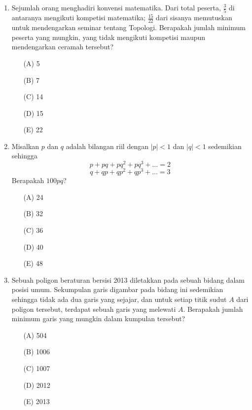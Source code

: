 \documentclass[12pt]{scrartcl}
\begin{document}
\begin{enumerate}
    \item Sejumlah orang menghadiri konvensi matematika. Dari total peserta, $\frac{3}{5}$ di antaranya mengikuti kompetisi matematika; $\frac{15}{22}$ dari sisanya memutuskan untuk mendengarkan seminar tentang Topologi. Berapakah jumlah minimum peserta yang mungkin, yang tidak mengikuti kompetisi maupun mendengarkan ceramah tersebut?
    \begin{itemize}
        \item[(A)] 5
        \item[(B)] 7
        \item[(C)] 14
        \item[(D)] 15
        \item[(E)] 22
    \end{itemize}

    \item Misalkan $p$ dan $q$ adalah bilangan riil dengan $|p|<1$ dan $|q|<1$ sedemikian sehingga
    \[p+pq+pq^{2}+pq^{3}+\dots=2\]
    \[q+qp+qp^{2}+qp^{3}+\dots=3\]
    Berapakah $100pq$?
    \begin{itemize}
        \item[(A)] 24
        \item[(B)] 32
        \item[(C)] 36
        \item[(D)] 40
        \item[(E)] 48
    \end{itemize}

    \item Sebuah poligon beraturan bersisi 2013 diletakkan pada sebuah bidang dalam posisi umum. Sekumpulan garis digambar pada bidang ini sedemikian sehingga tidak ada dua garis yang sejajar, dan untuk setiap titik sudut $A$ dari poligon tersebut, terdapat sebuah garis yang melewati $A$. Berapakah jumlah minimum garis yang mungkin dalam kumpulan tersebut?
    \begin{itemize}
        \item[(A)] 504
        \item[(B)] 1006
        \item[(C)] 1007
        \item[(D)] 2012
        \item[(E)] 2013
    \end{itemize}


\end{enumerate}
\end{document}
